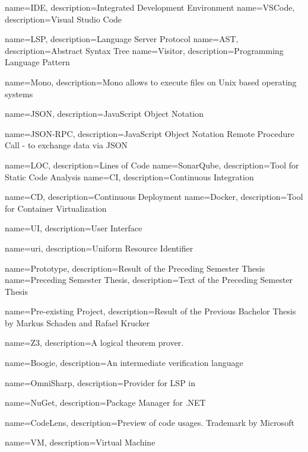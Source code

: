 {
	name=IDE,
	description={Integrated Development Environment}
}
{
	name=VSCode,
	description={Visual Studio Code}
}

{
	name=LSP,
	description={Language Server Protocol}
}
{
	name=AST,
	description={Abstract Syntax Tree}
}
{
	name=Visitor,
	description={Programming Language Pattern}
}

{
	name=Mono,
	description={Mono allows to execute  files on Unix based operating systems}
}

{
	name=JSON,
	description={JavaScript Object Notation}
}

{
	name=JSON-RPC,
	description={JavaScript Object Notation Remote Procedure Call - to exchange data via JSON}
}

{
	name=LOC,
	description={Lines of Code}
}
{
	name=SonarQube,
	description={Tool for Static Code Analysis}
}
{
	name=CI,
	description={Continuous Integration}
}

{
	name=CD,
	description={Continuous Deployment}
}
{
	name=Docker,
	description={Tool for Container Virtualization}
}

{
	name=UI,
	description={User Interface}
}

{
	name=uri,
	description={Uniform Resource Identifier} 
}

{
	name=Prototype,
	description={Result of the Preceding Semester Thesis}
}
{
	name=Preceding Semester Thesis,
	description={Text of the Preceding Semester Thesis}
}

{
	name=Pre-existing Project,
	description={Result of the Previous Bachelor Thesis by Markus Schaden and Rafael Krucker}
}

{
	name=Z3,
	description={A logical theorem prover.}
}

{
	name=Boogie,
	description={An intermediate verification language}
}

{
	name=OmniSharp,
	description={Provider for LSP in \Csharp}
}


{
	name=NuGet,
	description={Package Manager for .NET}
}

{
	name=CodeLens,
	description={Preview of code usages. Trademark by Microsoft}
}

{
	name=VM,
	description={Virtual Machine}
}
